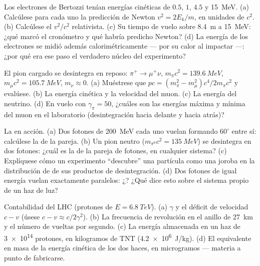 \begin{exercise}[$\star\star$]\label{exo:b3:relativistic-dynamics:5}
Los electrones de Bertozzi tenían energías cinéticas de $0.5$, $1$, $4.5$ y
\qty{15}{MeV}. (a) Calcúlese para cada uno la predicción de Newton
$v^2 = 2E_k/m$, en unidades de $c^2$. (b) Calcúlese el $v^2/c^2$ relativista.
(c) Su tiempo de vuelo sobre \qty{8.4}{m} a \qty{15}{MeV}: ¿qué marcó el
cronómetro y qué habría predicho Newton? (d) La energía de los electrones se
midió además calorimétricamente --- por su calor al impactar ---: ¿por qué
era ese paso el verdadero núcleo del experimento?
\end{exercise}

\begin{exercise}[$\star\star$]\label{exo:b3:relativistic-dynamics:6}
El pion cargado se desintegra en reposo: $\pi^+ \to \mu^+\nu$, $m_\pi c^2 =
\qty{139.6}{MeV}$, $m_\mu c^2 = \qty{105.7}{MeV}$, $m_\nu \approx 0$.
(a) Muéstrese que $pc = (m_\pi^2 - m_\mu^2)c^4/2m_\pi c^2$ y evalúese.
(b) La energía cinética y la velocidad del muon. (c) La energía del
neutrino. (d) En vuelo con $\gamma_\pi = 50$, ¿cuáles son las energías
máxima y mínima del muon en el laboratorio (desintegración hacia delante y
hacia atrás)?
\end{exercise}

\begin{exercise}[$\star\star$]\label{exo:b3:relativistic-dynamics:7}
La  en acción. (a) Dos fotones de \qty{200}{MeV} cada uno
vuelan formando $60^\circ$ entre sí: calcúlese la  de la
pareja. (b) Un pion neutro ($m_{\pi^0}c^2 = \qty{135}{MeV}$) se desintegra
en dos fotones: ¿cuál es la  de la pareja de fotones, en
cualquier sistema? (c) Explíquese cómo un experimento ``descubre'' una
partícula como una joroba en la distribución de  de sus
productos de desintegración. (d) Dos fotones de igual energía vuelan
exactamente paralelos: ¿? ¿Qué dice esto sobre el sistema
propio de un haz de luz?
\end{exercise}

\begin{exercise}[$\star\star$]\label{exo:b3:relativistic-dynamics:8}
Contabilidad del LHC (protones de $E = \qty{6.8}{TeV}$). (a) $\gamma$ y el
déficit de velocidad $c - v$ (úsese $c - v \approx c/2\gamma^2$). (b) La
frecuencia de revolución en el anillo de \qty{27}{km} y el número de vueltas
por segundo. (c) La energía almacenada en un haz de \num{3e14} protones, en
kilogramos de TNT (\qty{4.2e6}{J/kg}). (d) El equivalente en masa de la
energía cinética de los dos haces, en microgramos --- materia a punto de
fabricarse.
\end{exercise}

